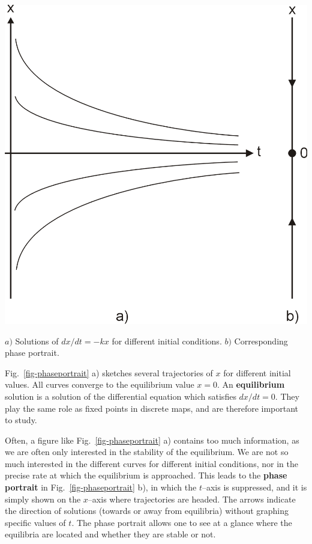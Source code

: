 \begin{marginfigure}
\centering
\includegraphics{dynamic/figures/phaseportrait}
\caption{$a)$ Solutions of ${dx}/{dt} = -k x$ for different initial conditions. $b)$ Corresponding phase portrait.}
\label{fig-phaseportrait}
\end{marginfigure} 

Fig.~\ref{fig-phaseportrait} a) sketches several trajectories of $x$ for different initial values. All curves converge to the equilibrium value $x=0$. An \textbf{equilibrium} solution is a solution of the differential equation which satisfies $dx/dt = 0$. They play the same role as fixed points in discrete maps, and are therefore important to study.

Often, a figure like Fig.~\ref{fig-phaseportrait}  a) contains too much information, as we are often only interested in the stability of the equilibrium. We are not so much interested in the different curves for different initial conditions, nor in the precise rate at which the equilibrium is approached. This leads to the \textbf{phase portrait} in Fig.~\ref{fig-phaseportrait} b), in which the $t$--axis is suppressed, and it is simply shown on the $x$--axis where trajectories are headed. The arrows indicate the direction of solutions (towards or away from equilibria) without graphing specific values of $t$. The phase portrait allows one to see at a glance where the equilibria are located and whether they are stable or not.


